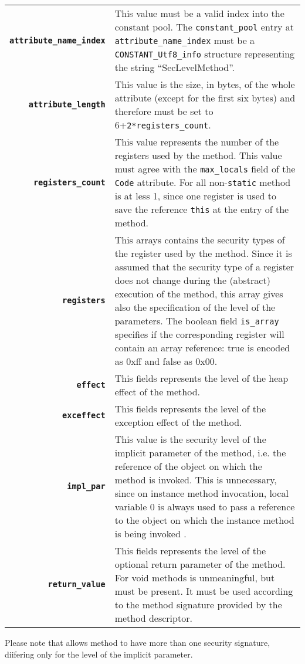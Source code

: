 \documentclass [a4paper,twoside]{article}
\begin{document}
\begin{supertabular}{rp{220pt}}
\textbf{\texttt{attribute\_name\_index}}& 
This value must be a valid index into the constant pool. The
\verb+constant_pool+ entry at \verb+attribute_name_index+ must be a
\verb+CONSTANT_Utf8_info+ structure representing the string
``SecLevelMethod''. \\
\textbf{\texttt{attribute\_length}}&
This value is the size, in bytes, of the whole attribute (except for
the first six bytes) and therefore must be set to
6+\verb+2*registers_count+.\\
\textbf{\texttt{registers\_count}}& 
This value represents the number of the registers used by
the method. This value must agree with the \verb+max_locals+ field of
the \verb+Code+ attribute. For all non-{\tt static} method is at less 1, 
since one register is used to save the reference {\tt this} at the entry 
of the method.\\
\textbf{\texttt{registers}}& 
This arrays contains the security types of the register used by the
method. Since it is assumed that the security type of a register does
not change during the (abstract) execution of the method, this array
gives also the specification of the level of the parameters. The boolean 
field \verb+is_array+ specifies if the corresponding register will contain 
an array reference: \textsf{true} is encoded as 0xff and \textsf{false} as 
0x00.\\
\textbf{\texttt{effect}}& 
This fields represents the level of the heap effect of the method.\\
\textbf{\texttt{exceffect}}& 
This fields represents the level of the exception effect of the
method.\\
\textbf{\texttt{impl\_par}}& 
This value is the security level of the implicit parameter of the
method, i.e. the reference of the object on which the method is
invoked. This is unnecessary, since on instance method invocation,
local variable 0 is always used to pass a reference to the object on
which the instance method is being invoked \cite[\S3.6.1]{VMSPEC2}.\\
\textbf{\texttt{return\_value}}& 
This fields represents the level of the optional return parameter of
the method. For void methods is unmeaningful, but must be present. It
must be used according to the method signature provided by the method
descriptor.\\
\end{supertabular}

Please note that \cite{BartheRezk} allows method to have more than one
security signature, diifering only for the level of the implicit
parameter.
\end{document}
